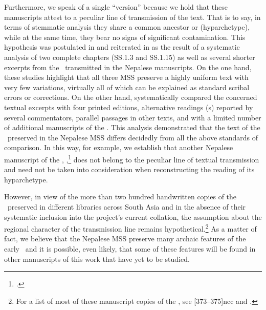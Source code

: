Furthermore, we speak of a single “version” because we hold that these manuscripts
attest to a peculiar line of transmission of the text.  That is to say, in terms of
stemmatic analysis they share %
a common ancestor or (hyparchetype), while at the same time, they
bear no signs of significant contamination.  This hypothesis was postulated in
\citet{kleb-2010} and reiterated in \citet{kleb-2021a} as the result of a
systematic analysis of two complete chapters (SS.1.3 and SS.1.15) %
as well as several shorter excerpts from the \SS\ transmitted in the Nepalese
manuscripts. On the one hand, these studies highlight that all three MSS preserve
a highly uniform text with very few variations, virtually all of which can be
explained as standard scribal errors or corrections. On the other hand,
\citet{kleb-2010,kleb-2021a} systematically compared %
the concerned textual excerpts with four printed editions, alternative readings
(s) reported by several commentators, %
parallel passages in other texts, and with a limited number of additional
manuscripts of the \SS. This analysis demonstrated that the text of the \SS\
preserved in the Nepalese MSS differs decidedly from all the above standards of
comparison. In this way, for example, we establish that another Nepalese
manuscript of the \SS, \MS{Kathmandu NAK 1-1146},\footcite{rima-2022} does not
belong to the peculiar line of textual transmission and need not be taken into
consideration when reconstructing the reading of its hyparchetype. 

However, in view of the more than two hundred handwritten copies of the \SS\ preserved
in different libraries across South Asia and in the absence of their systematic
inclusion into the project's current collation, 
the assumption about the regional character of the transmission line remains
hypothetical.\footnote{For a list of most of these manuscript copies of the \SS, see
     \volcite{39}[373--375]{ncc} and \cite{wuja-2020}.} 
    As a matter of fact, we believe that the Nepalese MSS
preserve many archaic features of the early \SS\ and it is possible, even likely, that
some of these features will be found in other manuscripts of this work that have
yet to be studied.%

